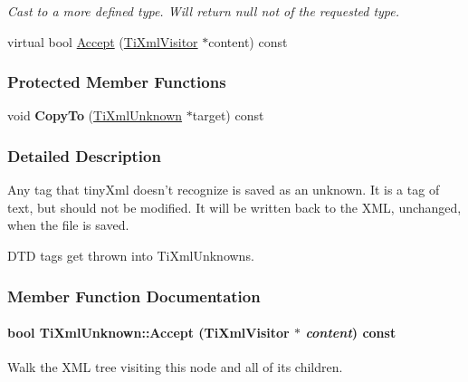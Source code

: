 \begin{DoxyCompactItemize}
\begin{DoxyCompactList}\small\item\em Cast to a more defined type. Will return null not of the requested type. \item\end{DoxyCompactList}\item 
virtual bool \hyperlink{class_ti_xml_unknown_a4e54d7482e05a837cf83c925cc683380}{Accept} (\hyperlink{class_ti_xml_visitor}{TiXmlVisitor} $\ast$content) const 
\end{DoxyCompactItemize}
\subsubsection*{Protected Member Functions}
\begin{DoxyCompactItemize}
\item 
\hypertarget{class_ti_xml_unknown_a08ca7b225a2bcb604d3c72e199d33408}{
void {\bfseries CopyTo} (\hyperlink{class_ti_xml_unknown}{TiXmlUnknown} $\ast$target) const }
\label{class_ti_xml_unknown_a08ca7b225a2bcb604d3c72e199d33408}

\end{DoxyCompactItemize}


\subsubsection{Detailed Description}
Any tag that tinyXml doesn't recognize is saved as an unknown. It is a tag of text, but should not be modified. It will be written back to the XML, unchanged, when the file is saved.

DTD tags get thrown into TiXmlUnknowns. 

\subsubsection{Member Function Documentation}
\hypertarget{class_ti_xml_unknown_a4e54d7482e05a837cf83c925cc683380}{
\paragraph[{Accept}]{\setlength{\rightskip}{0pt plus 5cm}bool TiXmlUnknown::Accept ({\bf TiXmlVisitor} $\ast$ {\em content}) const}\hfill}
\label{class_ti_xml_unknown_a4e54d7482e05a837cf83c925cc683380}
Walk the XML tree visiting this node and all of its children. 

